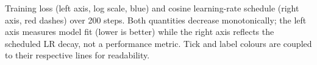 \caption{Training loss (left axis, log scale, blue) and cosine learning-rate schedule (right axis, red dashes) over 200 steps. Both quantities decrease monotonically; the left axis measures model fit (lower is better) while the right axis reflects the scheduled LR decay, not a performance metric. Tick and label colours are coupled to their respective lines for readability.}
